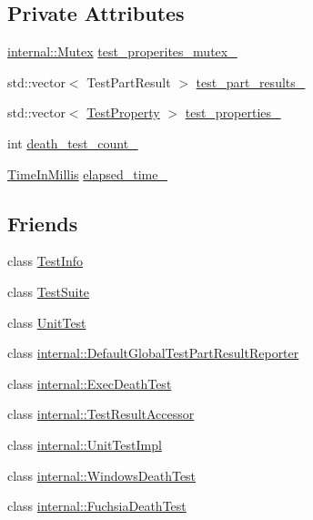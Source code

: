 \subsection*{Private Attributes}
\begin{DoxyCompactItemize}
\item 
\hyperlink{classtesting_1_1internal_1_1Mutex}{internal\+::\+Mutex} \hyperlink{classtesting_1_1TestResult_a58d7d97bd16a04b932e2863153c13dff}{test\+\_\+properites\+\_\+mutex\+\_\+}
\item 
std\+::vector$<$ Test\+Part\+Result $>$ \hyperlink{classtesting_1_1TestResult_af17c00fae1435d344b318eb6bbb56cff}{test\+\_\+part\+\_\+results\+\_\+}
\item 
std\+::vector$<$ \hyperlink{classtesting_1_1TestProperty}{Test\+Property} $>$ \hyperlink{classtesting_1_1TestResult_a29cde491988faff4ef2d9f9b6c13d9fa}{test\+\_\+properties\+\_\+}
\item 
int \hyperlink{classtesting_1_1TestResult_a3810b34e68f5dca9ad1237a5bde7fa21}{death\+\_\+test\+\_\+count\+\_\+}
\item 
\hyperlink{namespacetesting_a992de1d091ce660f451d1e8b3ce30fd6}{Time\+In\+Millis} \hyperlink{classtesting_1_1TestResult_a739a8ca54db4be004ba748b11e82b056}{elapsed\+\_\+time\+\_\+}
\end{DoxyCompactItemize}
\subsection*{Friends}
\begin{DoxyCompactItemize}
\item 
class \hyperlink{classtesting_1_1TestResult_a4c49c2cdb6c328e6b709b4542f23de3c}{Test\+Info}
\item 
class \hyperlink{classtesting_1_1TestResult_ab9aaba231fd11196425e75caf709bfc6}{Test\+Suite}
\item 
class \hyperlink{classtesting_1_1TestResult_a832b4d233efee1a32feb0f4190b30d39}{Unit\+Test}
\item 
class \hyperlink{classtesting_1_1TestResult_abae39633da9932847b41cb80efd62115}{internal\+::\+Default\+Global\+Test\+Part\+Result\+Reporter}
\item 
class \hyperlink{classtesting_1_1TestResult_adf5553cae6aea6f8648d47e299237e34}{internal\+::\+Exec\+Death\+Test}
\item 
class \hyperlink{classtesting_1_1TestResult_ae762da04e74a0d3b0daded3c5bd4a8e8}{internal\+::\+Test\+Result\+Accessor}
\item 
class \hyperlink{classtesting_1_1TestResult_acc0a5e7573fd6ae7ad1878613bb86853}{internal\+::\+Unit\+Test\+Impl}
\item 
class \hyperlink{classtesting_1_1TestResult_a6aeedc04a0590fcc1b3c5f687dbb0f9f}{internal\+::\+Windows\+Death\+Test}
\item 
class \hyperlink{classtesting_1_1TestResult_af29d5921f68031cdfba0b28cf4b3b559}{internal\+::\+Fuchsia\+Death\+Test}
\end{DoxyCompactItemize}


